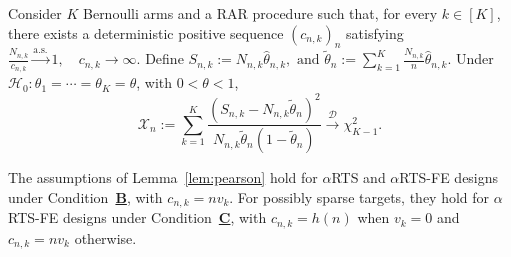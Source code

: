 {\color{revisiongreen}
\begin{lemma}\label{lem:pearson}
Consider \(K\) Bernoulli arms and a RAR procedure such that, for every \(k\in[K]\), there exists a deterministic positive sequence \((c_{n,k})_n\) satisfying
\(
\frac{N_{n,k}}{c_{n,k}}\xrightarrow{\mathrm{a.s.}}1,
\quad c_{n,k}\to\infty.
\)
Define
\(
S_{n,k}:=N_{n,k}\hat\theta_{n,k},\text{ and }
\tilde\theta_n:=\sum_{k=1}^K\frac{N_{n,k}}n\hat\theta_{n,k}.
\)
Under \(\mathcal H_0:\theta_1=\cdots=\theta_K=\theta\), with \(0<\theta<1\),
\[
\mathcal X_n:=\sum_{k=1}^K
\frac{(S_{n,k}-N_{n,k}\tilde\theta_n)^2}
{N_{n,k}\tilde\theta_n(1-\tilde\theta_n)}
\xrightarrow{\mathcal D}\chi^2_{K-1}.
\]
\end{lemma}
}
	\begin{remark}
        {\color{revisiongreen}The assumptions of Lemma~\ref{lem:pearson} hold for \(\alpha\)RTS and \(\alpha\)RTS-FE designs under Condition~\hyperlink{CB}{\textbf{B}}, with \(c_{n,k}=nv_k\). For possibly sparse targets, they hold for \(\alpha\)RTS-FE designs under Condition~\hyperlink{CC}{\textbf{C}}, with \(c_{n,k}=h(n)\) when \(v_k=0\) and \(c_{n,k}=nv_k\) otherwise.}
\end{remark}
